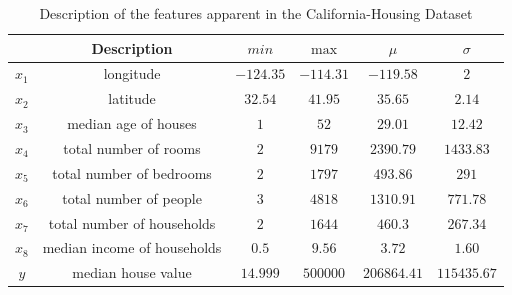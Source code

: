 \documentclass[twoside]{article}
\begin{document}
\begin{table}
  \caption{Description of the features apparent in the California-Housing Dataset}
  \label{tab:features-description}
  \centering
  \begin{tabular}{ c|c|c|c|c|c| }
    \hline
    & Description & \(min\) & \(\max\) & \(\mu\) & \(\sigma\) \\
    \hline
    \(x_1\) & longitude & \(-124.35\) & \(-114.31\) & \(-119.58\) & \(2\) \\
    \(x_2\) & latitude  & \(32.54\) & \(41.95\) & \(35.65\) & \(2.14\) \\
    \(x_3\) & median age of houses & \(1\) & \(52\) & \(29.01\) & \(12.42\) \\
    \(x_4\) & total number of rooms & \(2\) & \(9179\) & \(2390.79\) & \(1433.83\) \\
    \(x_5\) & total number of bedrooms & \(2\) & \(1797\) & \(493.86\) & \(291\) \\
    \(x_6\) & total number of people & \(3\) & \(4818\) & \(1310.91\) & \(771.78\) \\
    \(x_7\) & total number of households & \(2\) & \(1644\) & \(460.3\) & \(267.34\) \\
    \(x_8\) & median income of households & \(0.5\) & \(9.56\) & \(3.72\) & \(1.60\) \\
    \hline
    \(y\) & median house value & \(14.999\) & \(500000\) & \(206864.41\) & \(115435.67\) \\
    \hline
  \end{tabular}
\end{table}
\end{document}

